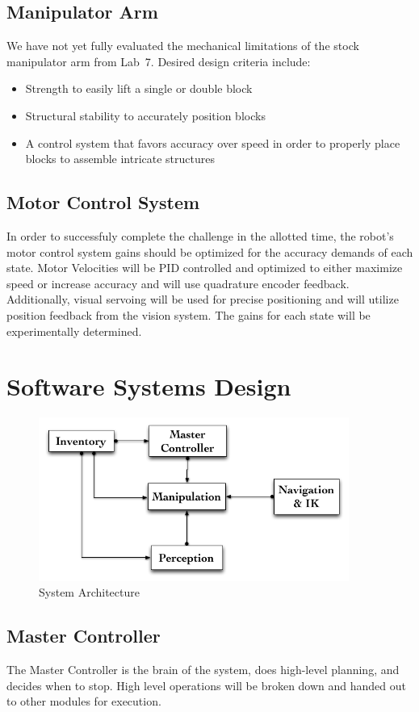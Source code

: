 \documentclass[letterpaper,11pt]{article}
\begin{document}
\subsection{Manipulator Arm}
We have not yet fully evaluated the mechanical limitations of the stock manipulator arm from Lab~7. Desired design criteria include:
\begin{itemize}
\item Strength to easily lift a single or double block
\item Structural stability to accurately position blocks
\item A control system that favors accuracy over speed in order to properly place blocks to assemble intricate structures
\end{itemize}
\subsection {Motor Control System}
In order to successfuly complete the challenge in the allotted time, the robot's motor control system gains should be optimized for the accuracy demands of each state. Motor Velocities will be PID controlled and optimized to either maximize speed or increase accuracy and will use quadrature encoder feedback. Additionally, visual servoing will be used for precise positioning and will utilize position feedback from the vision system. The gains for each state will be experimentally determined. 
\section{Software Systems Design}
\begin{figure}[h]
\centering
 \includegraphics[width=4in]{images/System_Architecture}
\caption{System Architecture}
\end{figure}

\subsection{Master Controller}
The Master Controller is the brain of the system, does high-level planning, and decides when to stop.
High level operations will be broken down and handed out to other modules for execution.
\end{document}
